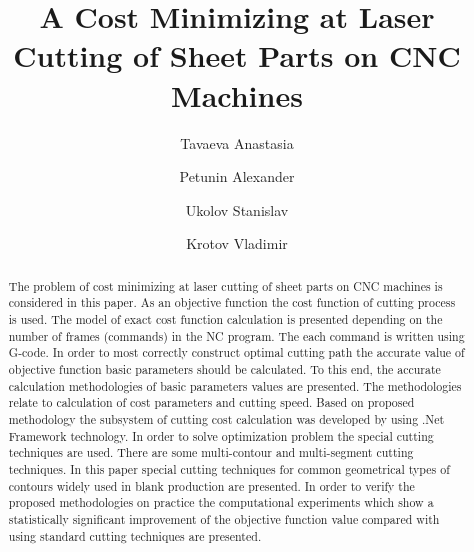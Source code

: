 \documentclass[runningheads]{llncs}
\begin{document}
\title{A Cost Minimizing at Laser Cutting of Sheet Parts on CNC Machines}

\author{
  Tavaeva Anastasia 
  \and
  Petunin Alexander  
  \and
  Ukolov Stanislav  
  \and
  Krotov Vladimir 
}

\maketitle              %

\begin{abstract}
The problem of cost minimizing at laser cutting of sheet parts on CNC machines is considered
in this paper.
As an objective function the cost function of cutting process is used.
The model of exact cost function calculation is presented
depending on the number of frames (commands) in the NC program.
The each command is written using G-code.
In order to most correctly construct optimal cutting path
the accurate value of objective function basic parameters should be calculated.
To this end,
the accurate calculation methodologies of basic parameters values are presented.
The methodologies relate to calculation of cost parameters and cutting speed.
Based on proposed methodology the subsystem of cutting cost calculation was developed by
using .Net Framework technology.
In order to solve optimization problem
the special cutting techniques are used.
There are some multi-contour and multi-segment cutting techniques.
In this paper special cutting techniques
for common geometrical types of contours
widely used in blank production are presented.
In order to verify the proposed methodologies on practice
the computational experiments which show
a statistically significant improvement of the objective function value
compared with using standard cutting techniques are presented.

\end{abstract}
\end{document}
